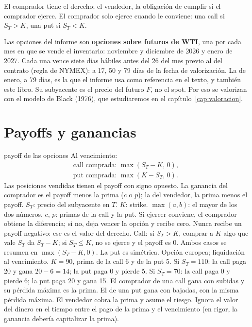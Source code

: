 El comprador tiene el derecho; el vendedor, la obligación de cumplir si el comprador ejerce. El comprador solo ejerce cuando le conviene: una call si $S_T>K$, una put si $S_T<K$.

\begin{informe}
Las opciones del informe son \textbf{opciones sobre futuros de WTI}, una por cada mes en que se vende el inventario: noviembre y diciembre de 2026 y enero de 2027. Cada una vence siete días hábiles antes del 26 del mes previo al del contrato (regla de NYMEX): a 17, 50 y 79 días de la fecha de valorización. La de enero, a 79 días, es la que el informe usa como referencia en el texto, y también este libro. Su subyacente es el precio del futuro $F$, no el spot. Por eso se valorizan con el modelo de Black (1976), que estudiaremos en el capítulo~\ref{cap:valoracion}.
\end{informe}

\section{Payoffs y ganancias}

\begin{ficha}{payoff de las opciones}
 Al vencimiento:
\begin{gather*}
\text{call comprada: } \max(S_T-K,\,0),\\
\text{put comprada: } \max(K-S_T,\,0).
\end{gather*}
Las posiciones vendidas tienen el payoff con signo opuesto. La ganancia del comprador es el payoff menos la prima ($c$ o $p$); la del vendedor, la prima menos el payoff.
 $S_T$: precio del subyacente en $T$. $K$: strike. $\max(a,b)$: el mayor de los dos números. $c$, $p$: primas de la call y la put.
 Si ejercer conviene, el comprador obtiene la diferencia; si no, deja vencer la opción y recibe cero. Nunca recibe un payoff negativo: ese es el valor del derecho.
 Call: si $S_T>K$, comprar a $K$ algo que vale $S_T$ da $S_T-K$; si $S_T\le K$, no se ejerce y el payoff es 0. Ambos casos se resumen en $\max(S_T-K,0)$. La put es simétrica.
 Opción europea; liquidación al vencimiento.
 $K=90$, prima de la call 6 y de la put 5. Si $S_T=110$: la call paga 20 y gana $20-6=14$; la put paga 0 y pierde 5. Si $S_T=70$: la call paga 0 y pierde 6; la put paga 20 y gana 15.
 El comprador de una call gana con subidas y su pérdida máxima es la prima. El de una put gana con bajadas, con la misma pérdida máxima. El vendedor cobra la prima y asume el riesgo.
 Ignora el valor del dinero en el tiempo entre el pago de la prima y el vencimiento (en rigor, la ganancia debería capitalizar la prima).
\end{ficha}

